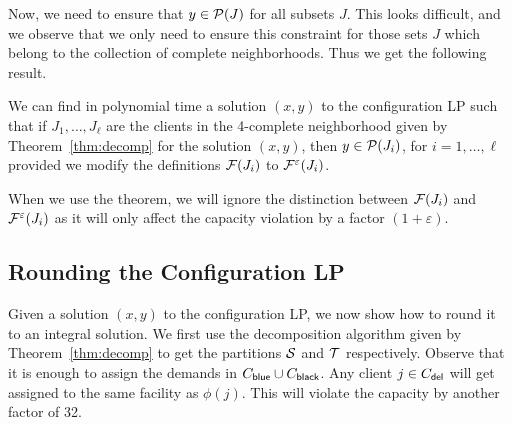 Now, we need to ensure that $y \in {\cal P}(J)$ for all subsets $J$. This looks difficult, and we observe that we only need to ensure this constraint
for those sets $J$ which belong to the collection of complete neighborhoods. Thus we get the following result. 

\begin{theorem}
\label{thm:ellipsoid}
We can find in polynomial time a solution $(x,y)$ to the configuration LP such that if $J_1, \ldots, J_\ell$ are the clients in the 4-complete neighborhood
given by Theorem~\ref{thm:decomp} for the solution $(x,y)$, then $y \in {\cal P}(J_i)$, for $i=1, \ldots, \ell$ provided we modify the definitions 
${\cal F}(J_i)$ to ${\cal F}^\varepsilon(J_i)$. 
\end{theorem}

\noindent
When we use the theorem, we will ignore the distinction between ${\cal F}(J_i)$ and ${\cal F}^\varepsilon(J_i)$ as it will only affect the capacity violation
by a factor $(1+\varepsilon)$. 
\subsection{Rounding the Configuration LP}
Given a solution $(x,y)$ to the configuration LP, we now show how to round it to an integral solution. We first use the decomposition algorithm given
by Theorem~\ref{thm:decomp} to get the partitions ${\cal S}$ and ${\cal T}$ respectively. Observe that it is enough to assign the demands in $C_{\mathsf{blue}} \cup C_{\mathsf{black}}$.
Any client $j \in C_{\mathsf{del}}$ will get assigned to the same facility as $\phi(j)$. This will violate the capacity by another factor of 32. 

